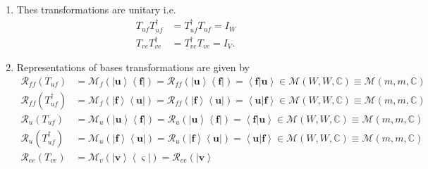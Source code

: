 \documentclass[aps,preprint]{revtex4}%
\begin{document}
\begin{enumerate}
\item Thes transformations are unitary i.e.%
\begin{align*}
T_{uf}T_{uf}^{\dagger}  &  =T_{uf}^{\dagger}T_{uf}=I_{W}\\
T_{ve}T_{ve}^{\dagger}  &  =T_{ve}^{\dagger}T_{ve}=I_{V}.
\end{align*}


\item Representations of bases transformations are given by
\begin{align*}
\mathcal{R}_{ff}\left(  T_{uf}\right)   &  =\mathcal{M}_{f}\left(  \left\vert
\mathbf{u}\right\rangle \left\langle \boldsymbol{f}\right\vert \right)
=\mathcal{R}_{ff}\left(  \left\vert \mathbf{u}\right\rangle \left\langle
\boldsymbol{f}\right\vert \right)  =\left\langle \left.  \boldsymbol{f}%
\right\vert \mathbf{u}\right\rangle \in\mathcal{M}\left(  W,W,\mathbb{C}%
\right)  \equiv\mathcal{M}\left(  m,m,\mathbb{C}\right) \\
\mathcal{R}_{ff}\left(  T_{uf}^{\dagger}\right)   &  =\mathcal{M}_{f}\left(
\left\vert \boldsymbol{f}\right\rangle \left\langle \mathbf{u}\right\vert
\right)  =\mathcal{R}_{ff}\left(  \left\vert \boldsymbol{f}\right\rangle
\left\langle \mathbf{u}\right\vert \right)  =\left\langle \left.
\boldsymbol{u}\right\vert \boldsymbol{f}\right\rangle \in\mathcal{M}\left(
W,W,\mathbb{C}\right)  \equiv\mathcal{M}\left(  m,m,\mathbb{C}\right) \\
\mathcal{R}_{u}\left(  T_{uf}\right)   &  =\mathcal{M}_{u}\left(  \left\vert
\mathbf{u}\right\rangle \left\langle \boldsymbol{f}\right\vert \right)
=\mathcal{R}_{u}\left(  \left\vert \mathbf{u}\right\rangle \left\langle
\boldsymbol{f}\right\vert \right)  =\left\langle \left.  \boldsymbol{f}%
\right\vert \mathbf{u}\right\rangle \in\mathcal{M}\left(  W,W,\mathbb{C}%
\right)  \equiv\mathcal{M}\left(  m,m,\mathbb{C}\right) \\
\mathcal{R}_{u}\left(  T_{uf}^{\dagger}\right)   &  =\mathcal{M}_{u}\left(
\left\vert \boldsymbol{f}\right\rangle \left\langle \mathbf{u}\right\vert
\right)  =\mathcal{R}_{u}\left(  \left\vert \boldsymbol{f}\right\rangle
\left\langle \mathbf{u}\right\vert \right)  =\left\langle \left.
\boldsymbol{u}\right\vert \boldsymbol{f}\right\rangle \in\mathcal{M}\left(
W,W,\mathbb{C}\right)  \equiv\mathcal{M}\left(  m,m,\mathbb{C}\right) \\
\mathcal{R}_{ee}\left(  T_{ve}\right)   &  =\mathcal{M}_{v}\left(  \left\vert
\mathbf{v}\right\rangle \left\langle \boldsymbol{\varsigma}\right\vert
\right)  =\mathcal{R}_{ee}\left(  \left\vert \mathbf{v}\right\rangle

\end{align*}
\end{enumerate}
\end{document}
